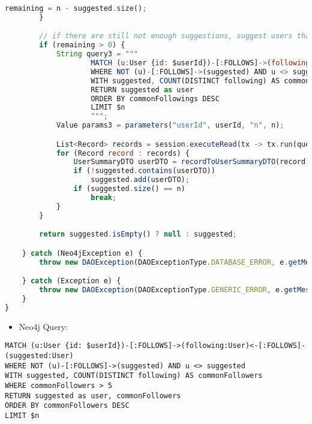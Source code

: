 \begin{lstlisting}[language=JavaScript]
            remaining = n - suggested.size();
        }

        // if there are still not enough suggestions, suggest users that follow the user's followings
        if (remaining > 0) {
            String query3 = """
                    MATCH (u:User {id: $userId})-[:FOLLOWS]->(following:User)<-[:FOLLOWS]-(suggested:User)
                    WHERE NOT (u)-[:FOLLOWS]->(suggested) AND u <> suggested
                    WITH suggested, COUNT(DISTINCT following) AS commonFollowings
                    RETURN suggested as user
                    ORDER BY commonFollowings DESC
                    LIMIT $n
                    """;
            Value params3 = parameters("userId", userId, "n", n);

            List<Record> records = session.executeRead(tx -> tx.run(query3, params3).list());
            for (Record record : records) {
                UserSummaryDTO userDTO = recordToUserSummaryDTO(record);
                if (!suggested.contains(userDTO))
                    suggested.add(userDTO);
                if (suggested.size() == n)
                    break;
            }
        }

        return suggested.isEmpty() ? null : suggested;

    } catch (Neo4jException e) {
        throw new DAOException(DAOExceptionType.DATABASE_ERROR, e.getMessage());

    } catch (Exception e) {
        throw new DAOException(DAOExceptionType.GENERIC_ERROR, e.getMessage());
    }
}
\end{lstlisting}
\begin{itemize}
    \item Neo4j Query:
\end{itemize}
\begin{lstlisting}[language=Cypher]
MATCH (u:User {id: $userId})-[:FOLLOWS]->(following:User)<-[:FOLLOWS]-(suggested:User) 
WHERE NOT (u)-[:FOLLOWS]->(suggested) AND u <> suggested 
WITH suggested, COUNT(DISTINCT following) AS commonFollowers 
WHERE commonFollowers > 5 
RETURN suggested as user, commonFollowers 
ORDER BY commonFollowers DESC 
LIMIT $n
\end{lstlisting}


